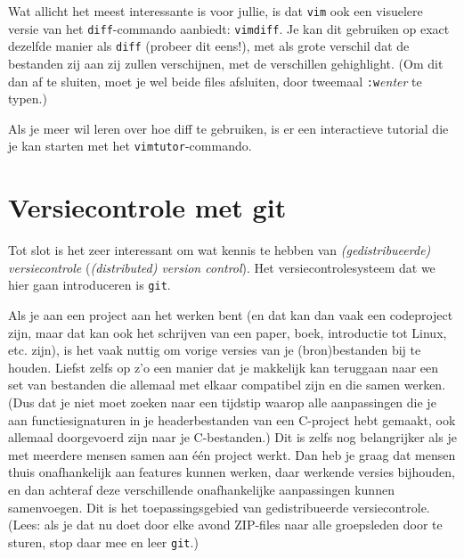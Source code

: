 \documentclass[a4paper,twoside,openany]{memoir}
\begin{document}
Wat allicht het meest interessante is voor jullie, is dat \verb!vim! ook een
visuelere versie van het \verb!diff!-commando aanbiedt: \verb!vimdiff!. Je kan
dit gebruiken op exact dezelfde manier als \verb!diff! (probeer dit eens!), met
als grote verschil dat de bestanden zij aan zij zullen verschijnen, met de
verschillen gehighlight. (Om dit dan af te sluiten, moet je wel beide files
afsluiten, door tweemaal \verb!:w!\emph{enter} te typen.)

Als je meer wil leren over hoe diff te gebruiken, is er een interactieve
tutorial die je kan starten met het \verb!vimtutor!-commando.

\chapter{Versiecontrole met git}

Tot slot is het zeer interessant om wat kennis te hebben van
\emph{(gedistribueerde) versiecontrole} (\emph{(distributed) version control}).
Het versiecontrolesysteem dat we hier gaan introduceren is \verb!git!.

Als je aan een project aan het werken bent (en dat kan dan vaak een codeproject
zijn, maar dat kan ook het schrijven van een paper, boek, introductie tot
Linux, etc. zijn), is het vaak nuttig om vorige versies van je (bron)bestanden
bij te houden. Liefst zelfs op z'o een manier dat je makkelijk kan teruggaan
naar een set van bestanden die allemaal met elkaar compatibel zijn en die samen
werken. (Dus dat je niet moet zoeken naar een tijdstip waarop alle aanpassingen
die je aan functiesignaturen in je headerbestanden van een C-project hebt
gemaakt, ook allemaal doorgevoerd zijn naar je C-bestanden.) Dit is zelfs nog
belangrijker als je met meerdere mensen samen aan één project werkt. Dan heb je
graag dat mensen thuis onafhankelijk aan features kunnen werken, daar werkende
versies bijhouden, en dan achteraf deze verschillende onafhankelijke
aanpassingen kunnen samenvoegen. Dit is het toepassingsgebied van
gedistribueerde versiecontrole. (Lees: als je dat nu doet door elke avond
ZIP-files naar alle groepsleden door te sturen, stop daar mee en leer
\verb!git!.)
\end{document}
